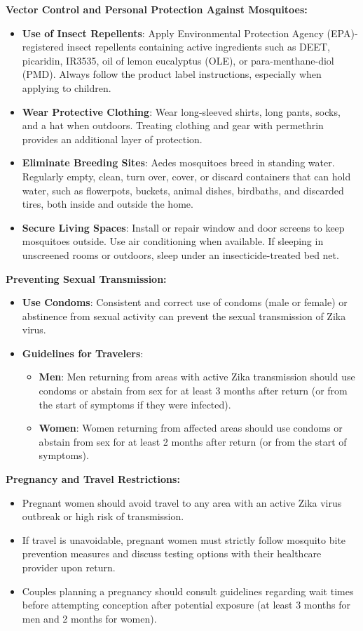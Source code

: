 \textbf{Vector Control and Personal Protection Against Mosquitoes:}
\begin{itemize}
    \item \textbf{Use of Insect Repellents}: Apply Environmental Protection Agency (EPA)-registered insect repellents containing active ingredients such as DEET, picaridin, IR3535, oil of lemon eucalyptus (OLE), or para-menthane-diol (PMD). Always follow the product label instructions, especially when applying to children.
    \item \textbf{Wear Protective Clothing}: Wear long-sleeved shirts, long pants, socks, and a hat when outdoors. Treating clothing and gear with permethrin provides an additional layer of protection.
    \item \textbf{Eliminate Breeding Sites}: Aedes mosquitoes breed in standing water. Regularly empty, clean, turn over, cover, or discard containers that can hold water, such as flowerpots, buckets, animal dishes, birdbaths, and discarded tires, both inside and outside the home.
    \item \textbf{Secure Living Spaces}: Install or repair window and door screens to keep mosquitoes outside. Use air conditioning when available. If sleeping in unscreened rooms or outdoors, sleep under an insecticide-treated bed net.
\end{itemize}

\textbf{Preventing Sexual Transmission:}
\begin{itemize}
    \item \textbf{Use Condoms}: Consistent and correct use of condoms (male or female) or abstinence from sexual activity can prevent the sexual transmission of Zika virus.
    \item \textbf{Guidelines for Travelers}:
    \begin{itemize}
        \item \textbf{Men}: Men returning from areas with active Zika transmission should use condoms or abstain from sex for at least 3 months after return (or from the start of symptoms if they were infected).
        \item \textbf{Women}: Women returning from affected areas should use condoms or abstain from sex for at least 2 months after return (or from the start of symptoms).
    \end{itemize}
\end{itemize}

\textbf{Pregnancy and Travel Restrictions:}
\begin{itemize}
    \item Pregnant women should avoid travel to any area with an active Zika virus outbreak or high risk of transmission.
    \item If travel is unavoidable, pregnant women must strictly follow mosquito bite prevention measures and discuss testing options with their healthcare provider upon return.
    \item Couples planning a pregnancy should consult guidelines regarding wait times before attempting conception after potential exposure (at least 3 months for men and 2 months for women).
\end{itemize}

